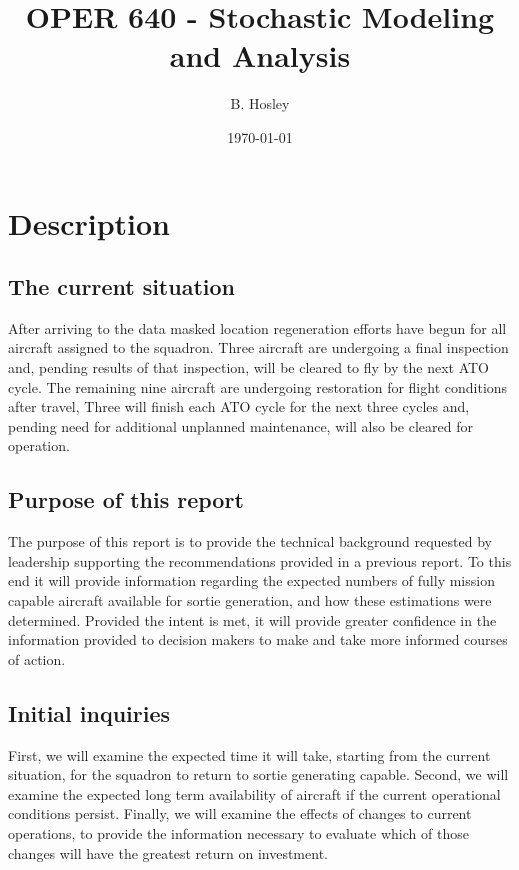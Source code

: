 \documentclass[12pt]{amsart}
\title{OPER 640 - Stochastic Modeling and Analysis}
\author{B. Hosley}
\date{\today}
\begin{document}
	\maketitle
	\raggedbottom

\section{Description}


\subsection{The current situation}

After arriving to the data masked location regeneration efforts have begun 
for all aircraft assigned to the squadron.
Three aircraft are undergoing a final inspection and, pending results of that inspection,
will be cleared to fly by the next ATO cycle.
The remaining nine aircraft are undergoing restoration for flight conditions after travel,
Three will finish each ATO cycle for the next three cycles and, pending need
for additional unplanned maintenance, will also be cleared for operation.

\subsection{Purpose of this report}

The purpose of this report is to provide the technical background requested by leadership
supporting the recommendations provided in a previous report.
To this end it will provide information regarding the expected numbers of fully mission 
capable aircraft available for sortie generation, and how these estimations were determined.
Provided the intent is met, it will provide greater confidence in the information
provided to decision makers to make and take more informed courses of action.

\subsection{Initial inquiries}

First, we will examine the expected time it will take, starting from the 
current situation, for the squadron to return to sortie generating capable.
Second, we will examine the expected long term availability of aircraft
if the current operational conditions persist.
Finally, we will examine the effects of changes to current operations, 
to provide the information necessary to evaluate which of those changes 
will have the greatest return on investment.
\end{document}
